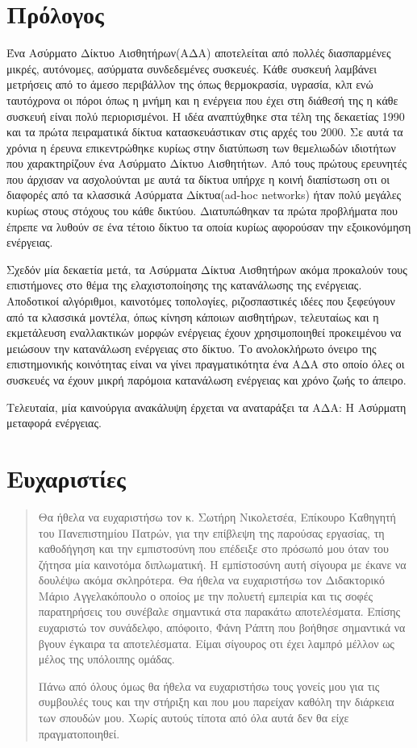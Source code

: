 \chapter{Πρόλογος}
Ένα Ασύρματο Δίκτυο Αισθητήρων(ΑΔΑ) αποτελείται από πολλές διασπαρμένες μικρές, αυτόνομες, ασύρματα συνδεδεμένες συσκευές. Κάθε συσκευή λαμβάνει μετρήσεις από το
άμεσο περιβάλλον της όπως θερμοκρασία, υγρασία, κλπ ενώ ταυτόχρονα οι πόροι όπως η μνήμη και η ενέργεια που έχει στη διάθεσή της η κάθε συσκευή είναι πολύ
περιορισμένοι.
Η ιδέα αναπτύχθηκε στα τέλη της δεκαετίας 1990 και τα πρώτα πειραματικά δίκτυα κατασκευάστικαν στις αρχές του 2000. Σε αυτά τα χρόνια η έρευνα επικεντρώθηκε κυρίως
στην διατύπωση των θεμελιωδών ιδιοτήτων που χαρακτηρίζουν ένα Ασύρματο Δίκτυο Αισθητήτων. Από τους πρώτους ερευνητές που άρχισαν να ασχολούνται με αυτά τα
δίκτυα υπήρχε η κοινή διαπίστωση οτι οι διαφορές από τα κλασσικά Ασύρματα Δίκτυα(ad-hoc networks) ήταν πολύ μεγάλες κυρίως στους στόχους του κάθε δικτύου.
Διατυπώθηκαν τα πρώτα προβλήματα που έπρεπε να λυθούν σε ένα τέτοιο δίκτυο τα οποία κυρίως αφορούσαν την εξοικονόμηση ενέργειας.

Σχεδόν μία δεκαετία μετά, τα Ασύρματα Δίκτυα Αισθητήρων ακόμα προκαλούν τους επιστήμονες στο θέμα της ελαχιστοποίησης της κατανάλωσης της ενέργειας. Αποδοτικοί
αλγόριθμοι, καινοτόμες τοπολογίες, ριζοσπαστικές ιδέες που ξεφεύγουν από τα κλασσικά μοντέλα, όπως κίνηση κάποιων αισθητήρων, τελευταίως και η εκμετάλευση
εναλλακτικών μορφών ενέργειας έχουν χρησιμοποιηθεί προκειμένου να μειώσουν την κατανάλωση ενέργειας στο δίκτυο. Το ανολοκλήρωτο όνειρο της επιστημονικής κοινότητας
είναι να γίνει πραγματικότητα ένα ΑΔΑ στο οποίο όλες οι συσκευές να έχουν μικρή παρόμοια κατανάλωση ενέργειας και χρόνο ζωής το άπειρο.

Τελευταία, μία καινούργια ανακάλυψη έρχεται να αναταράξει τα ΑΔΑ: Η Ασύρματη μεταφορά ενέργειας.

\chapter{Ευχαριστίες}
\begin{abstract}
Θα ήθελα να ευχαριστήσω τον κ. Σωτήρη Νικολετσέα, Επίκουρο Καθηγητή του Πανεπιστημίου Πατρών, για την επίβλεψη της παρούσας εργασίας, τη καθοδήγηση και την
εμπιστοσύνη που επέδειξε στο πρόσωπό μου όταν του ζήτησα μία καινοτόμα διπλωματική. Η εμπίστοσύνη αυτή σίγουρα με έκανε να δουλέψω ακόμα σκληρότερα. Θα ήθελα
να ευχαριστήσω τον Διδακτορικό Μάριο Αγγελακόπουλο ο οποίος με την πολυετή εμπειρία και τις σοφές παρατηρήσεις του συνέβαλε σημαντικά στα παρακάτω αποτελέσματα.
Επίσης ευχαριστώ τον συνάδελφο, απόφοιτο, Φάνη Ράπτη που βοήθησε σημαντικά να βγουν έγκαιρα τα αποτελέσματα. Είμαι σίγουρος οτι έχει λαμπρό μέλλον ως μέλος
της υπόλοιπης ομάδας.

Πάνω από όλους όμως θα ήθελα να ευχαριστήσω τους γονείς μου για τις συμβουλές τους και την στήριξη και που μου παρείχαν καθόλη την
διάρκεια των σπουδών μου. Χωρίς αυτούς τίποτα από όλα αυτά δεν θα είχε πραγματοποιηθεί.

\end{abstract}
\newpage
\tableofcontents
